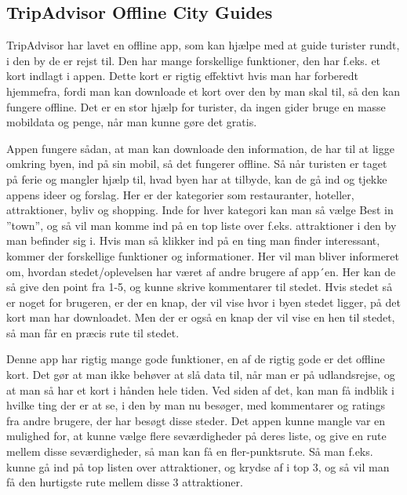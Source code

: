 \subsection{TripAdvisor Offline City Guides}
TripAdvisor har lavet en offline app, som kan hjælpe med at guide turister rundt, i den by de er rejst til. Den har mange forskellige funktioner, den har f.eks. et kort indlagt i appen. Dette kort er rigtig effektivt hvis man har forberedt hjemmefra, fordi man kan downloade et kort over den by man skal til, så den kan fungere offline. Det er en stor hjælp for turister, da ingen gider bruge en masse mobildata og penge, når man kunne gøre det gratis.
 
Appen fungere sådan, at man kan downloade den information, de har til at ligge omkring byen, ind på sin mobil, så det fungerer offline. Så når turisten er taget på ferie og mangler hjælp til, hvad byen har at tilbyde, kan de gå ind og tjekke appens ideer og forslag. Her er der kategorier som restauranter, hoteller, attraktioner, byliv og shopping. Inde for hver kategori kan man så vælge Best in ”town”, og så vil man komme ind på en top liste over f.eks. attraktioner i den by man befinder sig i.
Hvis man så klikker ind på en ting man finder interessant, kommer der forskellige funktioner og informationer. Her vil man bliver informeret om, hvordan stedet/oplevelsen har været af andre brugere af app´en. Her kan de så give den point fra 1-5, og kunne skrive kommentarer til stedet. Hvis stedet så er noget for brugeren, er der en knap, der vil vise hvor i byen stedet ligger, på det kort man har downloadet. Men der er også en knap der vil vise en hen til stedet, så man får en præcis rute til stedet.


Denne app har rigtig mange gode funktioner, en af de rigtig gode er det offline kort. Det gør at man ikke behøver at slå data til, når man er på udlandsrejse, og at man så har et kort i hånden hele tiden. Ved siden af det, kan man få indblik i hvilke ting der er at se, i den by man nu besøger, med kommentarer og ratings fra andre brugere, der har besøgt disse steder.
Det appen kunne mangle var en mulighed for, at kunne vælge flere seværdigheder på deres liste, og give en rute mellem disse seværdigheder, så man kan få en fler-punktsrute. Så man f.eks. kunne gå ind på top listen over attraktioner, og krydse af i top 3, og så vil man få den hurtigste rute mellem disse 3 attraktioner. 




